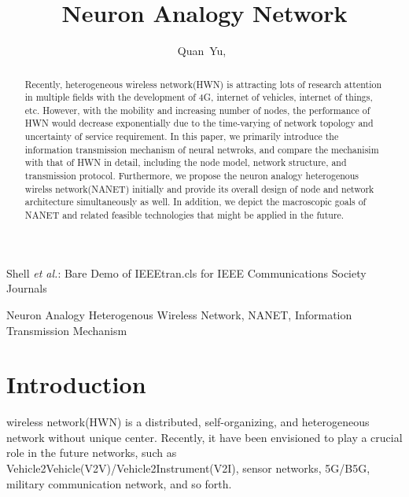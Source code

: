 \documentclass[journal,comsoc]{IEEEtran}
\begin{document}
	
	\title{Neuron Analogy Network}
	
	\author{Quan~Yu,~}	
	{Shell \MakeLowercase{\textit{et al.}}: Bare Demo of IEEEtran.cls for IEEE Communications Society Journals}
	\maketitle
	
	\begin{abstract}
		Recently, heterogeneous wireless network(HWN) is attracting lots of research attention in multiple fields with the development of 4G, internet of vehicles, internet of things, etc. 
		However, with the mobility and increasing number of nodes, the performance of HWN would decrease exponentially due to the time-varying of network topology and uncertainty of service requirement. 
		In this paper, we primarily introduce the information transmission mechanism of neural netwroks, 
		and compare the mechanisim with that of HWN in detail, 
		including the node model, network structure, and transmission protocol. 
		Furthermore, we propose the neuron analogy heterogenous wirelss network(NANET) initially and provide its overall design of node and network architecture simultaneously as well.
		In addition, we depict the macroscopic goals of NANET  and related feasible technologies that might be applied in the future.
	\end{abstract}
	
	\begin{IEEEkeywords}
		Neuron Analogy Heterogenous Wireless Network, NANET, 
		Information Transmission Mechanism
	\end{IEEEkeywords}
	
	\IEEEpeerreviewmaketitle
	
	\section{Introduction}
	\label{section: introduction}
	 wireless network(HWN) is a distributed, self-organizing, and heterogeneous network without unique center.
		Recently, it have been envisioned to play a crucial role in the future networks, 
		such as Vehicle2Vehicle(V2V)/Vehicle2Instrument(V2I), sensor networks, 5G/B5G, military communication network, and so forth.
		
\end{document}
